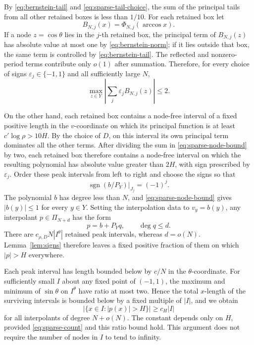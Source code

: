 \documentclass[11pt]{article}
\theoremstyle{definition}
\numberwithin{equation}{section}
\DeclareMathOperator{\sgn}{sgn}
\begin{document}
By \eqref{eq:bernstein-tail} and
\eqref{eq:sparse-tail-choice}, the sum of the principal tails from all
other retained boxes is less than \(1/10\). For each
retained box let
\[
 B_{N,j}(x)=\Phi_{N,j}(\arccos x).
\]
If a node \(z=\cos\theta\) lies in the \(j\)-th retained box, the
principal term of \(B_{N,j}(z)\) has absolute value at most one by
\eqref{eq:bernstein-norm}; if it lies outside that box, the same term
is controlled by \eqref{eq:bernstein-tail}. The reflected and
nonzero-period terms contribute only \(o(1)\) after summation.
Therefore, for every choice of signs
\(\varepsilon_j\in\{-1,1\}\) and all sufficiently large \(N\),
\begin{equation}\label{eq:sparse-node-bound}
 \max_{z\in Y}\left|\sum_j\varepsilon_j B_{N,j}(z)\right|\le2.
\end{equation}

On the other hand, each retained box contains a node-free interval
of a fixed positive length in the \(v\)-coordinate on which its
principal function is at least \(c'\log\rho>10H\). By the choice of
\(D\), on this interval its own principal term dominates all the
other terms. After dividing the sum in
\eqref{eq:sparse-node-bound} by two, each retained box therefore
contains a node-free interval on which the resulting polynomial has
absolute value greater than \(2H\), with sign prescribed by
\(\varepsilon_j\). Order these peak intervals from left to right and
choose the signs so that
\[
 \sgn(b/P_Y)|_{J_j}=(-1)^j.
\]
The polynomial \(b\) has degree less than \(N\), and
\eqref{eq:sparse-node-bound} gives \(|b(y)|\le1\) for every
\(y\in Y\). Setting the interpolation data to \(v_y=b(y)\), any
interpolant \(p\in\Pi_{N+d}\) has the form
\[
 p=b+P_Yq,\qquad \deg q\le d.
\]
There are \(c_{\rho,D}N|I^\theta|\) retained peak intervals, whereas
\(d=o(N)\). Lemma~\ref{lem:signs} therefore leaves a fixed positive
fraction of them on which \(|p|>H\) everywhere.

Each peak interval has length bounded below by \(c/N\) in the
\(\theta\)-coordinate. For sufficiently small \(I\) about any fixed
point of \((-1,1)\), the maximum and minimum of \(\sin\theta\) on
\(I^\theta\) have ratio at most two. Hence the total \(x\)-length of
the surviving intervals is bounded below by a fixed multiple of
\(|I|\), and we obtain
\begin{equation}\label{eq:sparse-amplification}
 |\{x\in I:|p(x)|>H\}|\ge c_H|I|
\end{equation}
for all interpolants of degree \(N+o(N)\).
The constant depends only on \(H\), provided
\eqref{eq:sparse-count} and this ratio bound hold.
This argument does not require the number of nodes in \(I\) to
tend to infinity.
\end{document}

